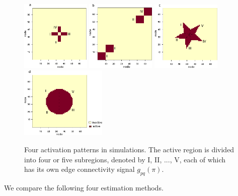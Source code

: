 \documentclass[aos]{imsart}
\theoremstyle{definition}
\begin{document}
\begin{figure}[t!]
\centering
\includegraphics[width=3.3cm]{figure/cross.pdf}
\includegraphics[width=3.3cm]{figure/block.pdf}
\includegraphics[width=3.3cm]{figure/star.pdf}
\includegraphics[width=4.1cm]{figure/circle.pdf}
\caption{Four activation patterns in simulations. The active region is divided into four or five subregions, denoted by I, II, ..., V, each of which has its own edge connectivity signal $g_{pq}(\pi)$.}
\label{fig:region}
\end{figure}

We compare the following four estimation methods. 
\end{document}
